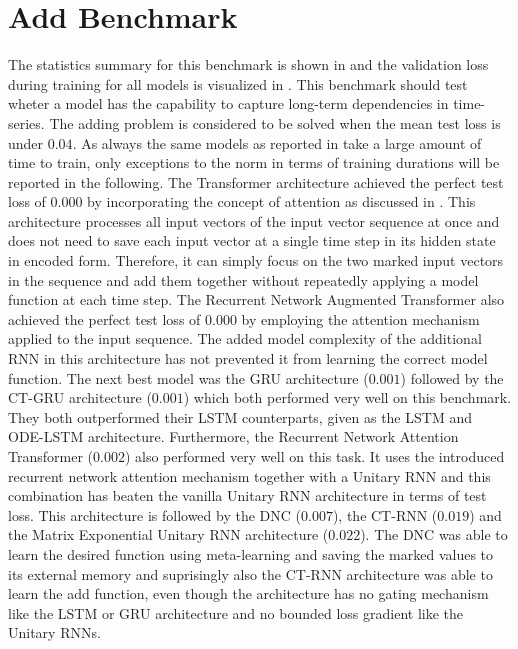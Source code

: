 \documentclass[draft,final]{vutinfth} %
\begin{document}
    \section{Add Benchmark} \label{add_results}
    The statistics summary for this benchmark is shown in  and the validation loss during training for all models is visualized in .
    This benchmark should test wheter a model has the capability to capture long-term dependencies in time-series.
    The adding problem is considered to be solved when the mean test loss is under $0.04$.
    As always the same models as reported in  take a large amount of time to train, only exceptions to the norm in terms of training durations will be reported in the following.
    The Transformer architecture achieved the perfect test loss of $0.000$ by incorporating the concept of attention as discussed in .
    This architecture processes all input vectors of the input vector sequence at once and does not need to save each input vector at a single time step in its hidden state in encoded form.
    Therefore, it can simply focus on the two marked input vectors in the sequence and add them together without repeatedly applying a model function at each time step.
    The Recurrent Network Augmented Transformer also achieved the perfect test loss of $0.000$ by employing the attention mechanism applied to the input sequence. 
    The added model complexity of the additional RNN in this architecture has not prevented it from learning the correct model function.
    The next best model was the GRU architecture ($0.001$) followed by the CT-GRU architecture ($0.001$) which both performed very well on this benchmark.
    They both outperformed their LSTM counterparts, given as the LSTM and ODE-LSTM architecture. 
    Furthermore, the Recurrent Network Attention Transformer ($0.002$) also performed very well on this task.
    It uses the introduced recurrent network attention mechanism together with a Unitary RNN and this combination has beaten the vanilla Unitary RNN architecture in terms of test loss.
    This architecture is followed by the DNC ($0.007$), the CT-RNN ($0.019$) and the Matrix Exponential Unitary RNN architecture ($0.022$).
    The DNC was able to learn the desired function using meta-learning and saving the marked values to its external memory and suprisingly also the CT-RNN architecture was able to learn the add function, even though the architecture has no gating mechanism like the LSTM or GRU architecture and no bounded loss gradient like the Unitary RNNs.
\end{document}

